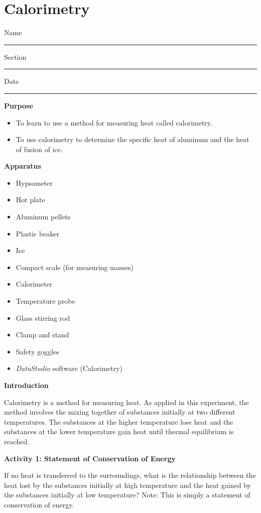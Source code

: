 \setcounter{equation}{0}
\setcounter{figure}{0}

\section{Calorimetry}

Name \rule{2.0in}{0.1pt}\hfill{}Section \rule{1.0in}{0.1pt}\hfill{}Date
\rule{1.0in}{0.1pt}

\textbf{Purpose}

\begin{itemize}

\item To learn to use a method for measuring heat called calorimetry.

\item To use calorimetry to determine the specific heat of aluminum and
the heat of fusion of ice.

\end{itemize}

\textbf{Apparatus}

\begin{itemize}
\item Hypsometer
\item Hot plate 
\item Aluminum pellets 
\item Plastic beaker
\item Ice 
\item Compact scale (for measuring masses)
\item Calorimeter
\item Temperature probe
\item Glass stirring rod
\item Clamp and stand
\item Safety goggles
\item \textit{DataStudio} software (Calorimetry)
\end{itemize}
\textbf{Introduction} 

Calorimetry is a method for measuring heat. As applied in this experiment,
the method involves the mixing together of substances initially at
two different temperatures. The substances at the higher temperature
lose heat and the substances at the lower temperature gain heat until
thermal equilibrium is reached.

\textbf{Activity 1: Statement of Conservation of Energy}

If no heat is transferred to the surroundings, what is the relationship
between the heat lost by the substances initially at high temperature
and the heat gained by the substances initially at low temperature?
Note: This is simply a statement of conservation of energy.

